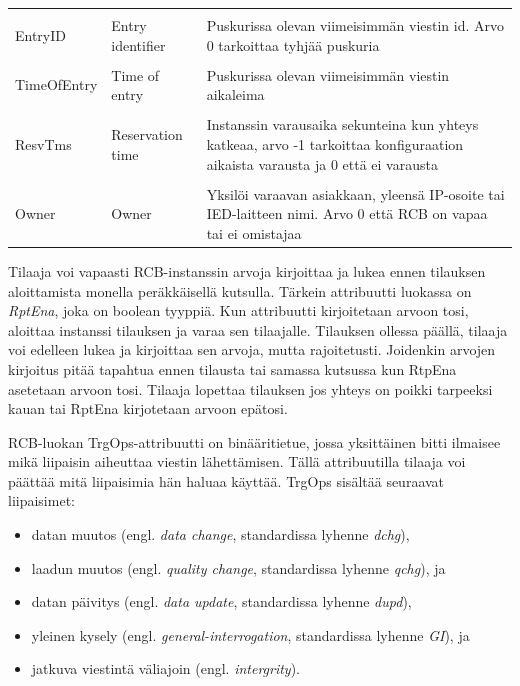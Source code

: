 \begin{table}[ht!]
\begin{tabular}{l | l | l}
		&\\
		EntryID & Entry identifier & \parbox[t]{7.5cm}{Puskurissa olevan viimeisimmän viestin id. Arvo 0 tarkoittaa tyhjää puskuria} \\
		&\\
		TimeOfEntry & Time of entry & \parbox[t]{7.5cm}{Puskurissa olevan viimeisimmän viestin aikaleima} \\
		&\\
		ResvTms & Reservation time & \parbox[t]{7.5cm}{Instanssin varausaika sekunteina kun yhteys katkeaa, arvo -1 tarkoittaa konfiguraation aikaista varausta ja 0 että ei varausta} \\
		&\\
		Owner & Owner & \parbox[t]{7.5cm}{Yksilöi varaavan asiakkaan, yleensä IP-osoite tai IED-laitteen nimi. Arvo 0 että RCB on vapaa tai ei omistajaa} \\
		\hline
	\end{tabular}
\end{table}

Tilaaja voi vapaasti RCB-instanssin arvoja kirjoittaa ja lukea ennen tilauksen aloittamista monella peräkkäisellä kutsulla. Tärkein attribuutti luokassa on \emph{RptEna}, joka on boolean tyyppiä. Kun attribuutti kirjoitetaan arvoon tosi, aloittaa instanssi tilauksen ja varaa sen tilaajalle. Tilauksen ollessa päällä, tilaaja voi edelleen lukea ja kirjoittaa sen arvoja, mutta rajoitetusti. Joidenkin arvojen kirjoitus pitää tapahtua ennen tilausta tai samassa kutsussa kun RtpEna asetetaan arvoon tosi. Tilaaja lopettaa tilauksen jos yhteys on poikki tarpeeksi kauan tai RptEna kirjotetaan arvoon epätosi.

RCB-luokan TrgOps-attribuutti on binääritietue, jossa yksittäinen bitti ilmaisee mikä liipaisin aiheuttaa viestin lähettämisen. Tällä attribuutilla tilaaja voi päättää mitä liipaisimia hän haluaa käyttää. TrgOps sisältää seuraavat liipaisimet:
\begin{itemize}
	\item datan muutos (engl. \emph{data change}, standardissa lyhenne \emph{dchg}),
	\item laadun muutos (engl. \emph{quality change}, standardissa lyhenne \emph{qchg}), ja
	\item datan päivitys (engl. \emph{data update}, standardissa lyhenne \emph{dupd}),
	\item yleinen kysely (engl. \emph{general-interrogation}, standardissa lyhenne \emph{GI}), ja 
	\item jatkuva viestintä väliajoin (engl. \emph{intergrity}).
\end{itemize}


